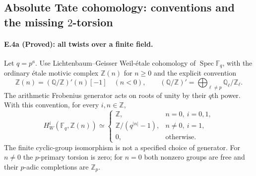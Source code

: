 \subsection{Absolute Tate cohomology: conventions and the missing $2$-torsion}
\label{sec:real-weil-E4}

\paragraph{E.4a (Proved): all twists over a finite field.}
Let $q=p^a$. Use Lichtenbaum--Geisser Weil-\'etale cohomology of
$\operatorname{Spec}\mathbb F_q$, with the ordinary \'etale motivic complex
$\mathbb Z(n)$ for $n\geq0$ and the explicit convention
\[
 \mathbb Z(n)=(\mathbb Q/\mathbb Z)'(n)[-1]\quad(n<0),
 \qquad(\mathbb Q/\mathbb Z)'=\bigoplus_{\ell\ne p}\mathbb Q_\ell/\mathbb Z_\ell.
 \tag{E.1}
\]
The arithmetic Frobenius generator acts on roots of unity by their $q$th
power. With this convention, for every $i,n\in\mathbb Z$,
\[
 H_W^i(\mathbb F_q,\mathbb Z(n))\simeq
 \begin{cases}
  \mathbb Z,& n=0,\ i=0,1,\\
  \mathbb Z/(q^{|n|}-1),& n\ne0,\ i=1,\\
  0,&\text{otherwise}.
 \end{cases}
 \tag{E.2}
\]
The finite cyclic-group isomorphism is not a specified choice of generator.
For $n\ne0$ the $p$-primary torsion is zero; for $n=0$ both nonzero
groups are free and their $p$-adic completions are $\mathbb Z_p$.

